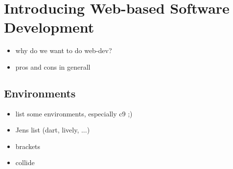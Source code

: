 \section{Introducing Web-based Software Development}
\label{sec:Introduction}

\begin{itemize}
	\item why do we want to do web-dev?
	\item pros and cons in generall
\end{itemize}

\subsection{Environments}
\begin{itemize}
	\item list some environments, especially c9 ;)
	\item Jens list (dart, lively, ...)
	\item brackets
	\item collide
\end{itemize}